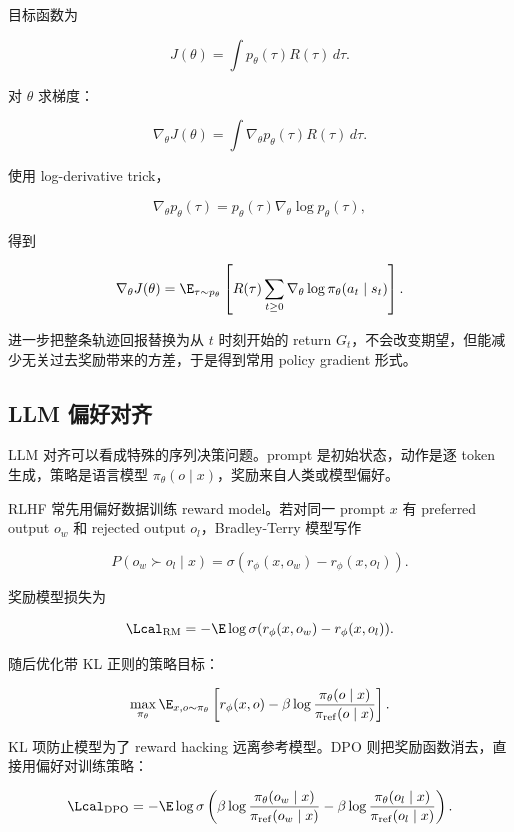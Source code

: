 目标函数为

\[
  J(\theta)
  =
  \int p_\theta(\tau)R(\tau)\,d\tau.
\]

对 \(\theta\) 求梯度：

\[
  \nabla_\theta J(\theta)
  =
  \int
  \nabla_\theta p_\theta(\tau)R(\tau)\,d\tau.
\]

使用 log-derivative trick，

\[
  \nabla_\theta p_\theta(\tau)
  =
  p_\theta(\tau)\nabla_\theta\log p_\theta(\tau),
\]

得到

\[
  \nabla_\theta J(\theta)
  =
  \E_{\tau\sim p_\theta}
  \left[
    R(\tau)
    \sum_{t\ge0}
    \nabla_\theta\log\pi_\theta(a_t\mid s_t)
  \right].
\]

进一步把整条轨迹回报替换为从 \(t\) 时刻开始的 return \(G_t\)，不会改变期望，但能减少无关过去奖励带来的方差，于是得到常用 policy gradient 形式。

\subsection{LLM 偏好对齐}


LLM 对齐可以看成特殊的序列决策问题。prompt 是初始状态，动作是逐 token 生成，策略是语言模型 \(\pi_\theta(o\mid x)\)，奖励来自人类或模型偏好。

RLHF 常先用偏好数据训练 reward model。若对同一 prompt \(x\) 有 preferred output \(o_w\) 和 rejected output \(o_l\)，Bradley-Terry 模型写作

\[
  P(o_w\succ o_l\mid x)
  =
  \sigma(r_\phi(x,o_w)-r_\phi(x,o_l)).
\]

奖励模型损失为

\[
  \Lcal_{\mathrm{RM}}
  =
  -
  \E
  \log
  \sigma(r_\phi(x,o_w)-r_\phi(x,o_l)).
\]

随后优化带 KL 正则的策略目标：

\[
  \max_{\pi_\theta}
  \E_{x,o\sim\pi_\theta}
  \left[
    r_\phi(x,o)
    -
    \beta
    \log
    \frac{\pi_\theta(o\mid x)}{\pi_{\mathrm{ref}}(o\mid x)}
  \right].
\]

KL 项防止模型为了 reward hacking 远离参考模型。DPO 则把奖励函数消去，直接用偏好对训练策略：

\[
  \Lcal_{\mathrm{DPO}}
  =
  -
  \E
  \log
  \sigma
  \left(
    \beta
    \log
    \frac{\pi_\theta(o_w\mid x)}{\pi_{\mathrm{ref}}(o_w\mid x)}
    -
    \beta
    \log
    \frac{\pi_\theta(o_l\mid x)}{\pi_{\mathrm{ref}}(o_l\mid x)}
  \right).
\]

